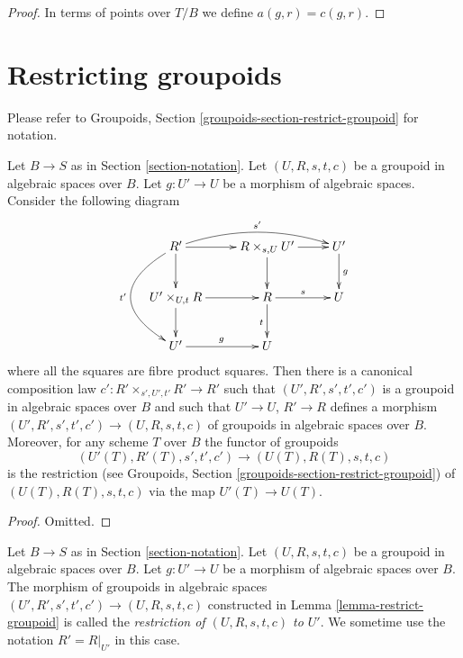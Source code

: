 \begin{proof}
In terms of points over $T/B$ we define $a(g, r) = c(g, r)$.
\end{proof}








\section{Restricting groupoids}
\label{section-restrict-groupoid}

\noindent
Please refer to
Groupoids, Section \ref{groupoids-section-restrict-groupoid}
for notation.

\begin{lemma}
\label{lemma-restrict-groupoid}
Let $B \to S$ as in Section \ref{section-notation}.
Let $(U, R, s, t, c)$ be a groupoid in algebraic spaces over $B$.
Let $g : U' \to U$ be a morphism of algebraic spaces.
Consider the following diagram
$$
\xymatrix{
R' \ar[d] \ar[r] \ar@/_3pc/[dd]_{t'} \ar@/^1pc/[rr]^{s'}&
R \times_{s, U} U' \ar[r] \ar[d] &
U' \ar[d]^g \\
U' \times_{U, t} R \ar[d] \ar[r] &
R \ar[r]^s \ar[d]_t &
U \\
U' \ar[r]^g &
U
}
$$
where all the squares are fibre product squares. Then there is a
canonical composition law $c' : R' \times_{s', U', t'} R' \to R'$
such that $(U', R', s', t', c')$ is a groupoid in algebraic spaces over
$B$ and such that $U' \to U$, $R' \to R$ defines a morphism
$(U', R', s', t', c') \to (U, R, s, t, c)$ of groupoids in algebraic spaces
over $B$. Moreover, for any scheme $T$ over $B$ the functor of groupoids
$$
(U'(T), R'(T), s', t', c') \to (U(T), R(T), s, t, c)
$$
is the restriction (see
Groupoids, Section \ref{groupoids-section-restrict-groupoid})
of $(U(T), R(T), s, t, c)$ via the map $U'(T) \to U(T)$.
\end{lemma}

\begin{proof}
Omitted.
\end{proof}

\begin{definition}
\label{definition-restrict-groupoid}
Let $B \to S$ as in Section \ref{section-notation}.
Let $(U, R, s, t, c)$ be a groupoid in algebraic spaces over $B$.
Let $g : U' \to U$ be a morphism of algebraic spaces over $B$.
The morphism of groupoids in algebraic spaces
$(U', R', s', t', c') \to (U, R, s, t, c)$
constructed in Lemma \ref{lemma-restrict-groupoid} is called
the {\it restriction of $(U, R, s, t, c)$ to $U'$}.
We sometime use the notation $R' = R|_{U'}$ in this case.
\end{definition}

